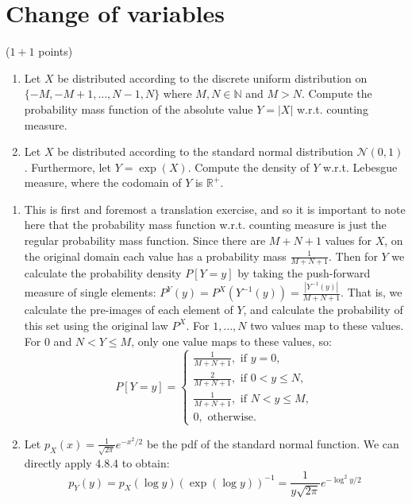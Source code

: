 \section{Change of variables}
($1+1$ points)
\begin{enumerate}
\item Let $X$ be distributed according to the discrete uniform distribution on $\{-M, -M+1, \dots, N-1, N\}$ where $M,N \in \mathbb{N}$ and $M>N$. Compute the probability mass function of the absolute value $Y=|X|$ w.r.t. counting measure.
\item Let $X$ be distributed according to the standard normal distribution $\mathcal{N}(0,1)$. Furthermore, let $Y = \exp (X)$. Compute the density of $Y$ w.r.t. Lebesgue measure, where the codomain of $Y$ is $\mathbb{R}^+$.
\end{enumerate}
\begin{gradedsolution}
    \begin{enumerate}
        \item This is first and foremost a translation exercise, and so it is important to note here that the probability mass function w.r.t. counting measure is just the regular probability mass function. Since there are $M+N+1$ values for $X$, on the original domain each value has a probability mass $\frac{1}{M+N+1}$. Then for $Y$ we calculate the probability density $P[Y=y]$ by taking the push-forward measure of single elements: $P^Y(y) = P^X(Y^{-1}(y)) = \frac{|Y^{-1}(y)|}{M+N+1}$. That is, we calculate the pre-images of each element of $Y$, and calculate the probability of this set using the original law $P^X$. For $1, \dots, N$ two values map to these values. For $0$ and $N < Y \leq M$, only one value maps to these values, so:
        \[
            P[Y=y] = \begin{cases}
            \frac{1}{M+N+1}, \text{ if } y = 0,\\
            \frac{2}{M+N+1}, \text{ if } 0 < y \leq N,\\
            \frac{1}{M+N+1}, \text{ if } N < y \leq M,\\
            0, \text{ otherwise.}
          \end{cases}
        \]
        \item Let $p_X(x)=\frac{1}{\sqrt{2\pi}} e^{-x^2/2}$ be the pdf of the standard normal function. We can directly apply 4.8.4 to obtain:
        \[
          p_Y(y) = p_X(\log y) (\exp(\log y))^{-1} = \frac{1}{y\sqrt{2\pi}} e^{-\log^2 y/2}
        \]
    \end{enumerate}
\end{gradedsolution}

